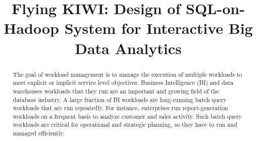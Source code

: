 \documentclass[conference]{IEEEtran}
\begin{document}
    \title{Flying KIWI: Design of SQL-on-Hadoop System for Interactive Big Data Analytics}

    \author{
 }

\maketitle

\begin{abstract}
The goal of workload management is to manage the execution of multiple workloads to meet explicit or implicit service level objectives. 
Business Intelligence (BI) and data warehouses workloads that they run are an important and growing field of the database industry.
A large fraction of BI workloads are long-running batch query workloads that are run repeatedly.
For instance, enterprises run report-generation workloads on a frequent basis to analyze customer and sales activity.
Such batch query workloads are critical for operational and strategic planning, so they have to run and managed efficiently.
\end{abstract}
\end{document}
